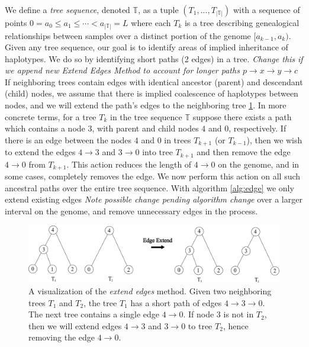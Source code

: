 \documentclass[10pt,twoside,lineno]{gsajnl}
\newcommand{\T}{\mathbb{T}}
\newcommand{\comment}[1]{{\color{blue} \it #1}}
\begin{document}
    We define a \textit{tree sequence}, denoted $\T$, 
    as a tuple $\left(T_1,...,T_{|\T|}\right)$ with a sequence of points
	$0 = a_0 \leq a_1 \leq \cdots < a_{|\T|} = L$ where
     each $T_k$ is a tree describing genealogical relationships between samples
     over a distinct portion of the genome $[a_{k-1}, a_k)$.
    Given any tree sequence, our goal is to
    identify areas of implied inheritance of haplotypes.
    We do so by identifying short paths (2 edges) in a tree.
    \comment{Change this if we append new Extend Edges Method to account for longer paths $p\to x \to y\to c$}
    If neighboring trees contain edges with 
    identical ancestor (parent) and descendant (child) nodes, 
    we assume that there is implied coalescence of haplotypes between nodes, 
    and we will extend the path's edges to the neighboring tree \ref{fig:extending_diagram}.
  	In more concrete terms, for a tree $T_k$ in the tree sequence $\T$ 
    suppose there exists a path which contains a node $3$,
    with parent and child nodes $4$ and $0$, respectively.
    If there is an edge between the nodes $4$ and $0$ in trees 
    $T_{k+1}$ (or $T_{k-1}$),
    then we wish to extend the edges $4\to 3$ and $3\to 0$ 
    into tree $T_{k+1}$ and then remove the edge $4 \to 0$ from $T_{k+1}$. 
    This action reduces the length of $4 \to 0$ on the genome,
    and in some cases, completely removes the edge. 
    We now perform this action on all such ancestral paths 
    over the entire tree sequence.
    With algorithm \ref{alg:edge} we only extend existing edges
    \comment{Note possible change pending algorithm change}
    over a larger interval on the genome,
    and remove unnecessary edges in the process.

\begin{figure}[!ht]
\begin{center}
	\includegraphics[width=5in]{edge_extend_method.pdf}
\end{center}
\caption{A visualization of the \textit{extend edges} method. Given two neighboring trees $T_1$ and $T_2$, the tree $T_1$ has a short path of edges $4 \to 3\to0$. The next tree contains a single edge $4 \to 0$. If node $3$ is not in $T_2$, then we will extend edges $ 4\to 3$ and $3\to 0$ to tree $T_2$, hence removing the edge $4\to 0$. 
    \label{fig:extending_diagram}
}
\end{figure}
\end{document}
